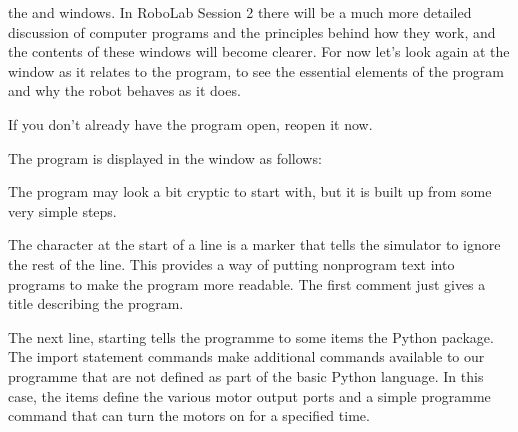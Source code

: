 \documentclass[letterpaper,10pt,english]{sphinxmanual}
\begin{document}
the  and  windows. In RoboLab Session 2 there will be a much more detailed discussion of computer programs and the principles behind how they work, and the contents of these windows will become clearer. For now let’s look again at the  window as it relates to the  program, to see the essential elements of the program and why the robot behaves as it does.

If you don’t already have the  program open, reopen it now.

The  program is displayed in the  window as follows:

\begin{sphinxVerbatim}[commandchars=\\\{\}]


     

   

  
\end{sphinxVerbatim}

The program may look a bit cryptic to start with, but it is built up from some very simple steps.

The \sphinxcode{\sphinxupquote{\#}} character at the start of a line is a  marker that tells the simulator to ignore the rest of the line. This provides a way of putting non\sphinxhyphen{}program text into programs to make the program more readable. The first comment just gives a title describing the program.

The next line, starting  tells the programme to  some items  the  Python package. The import statement commands make additional commands available to our programme that are not defined as part of the basic Python language. In this case, the items define the various motor output ports and a simple programme command that can turn the motors on for a specified time.
\end{document}
